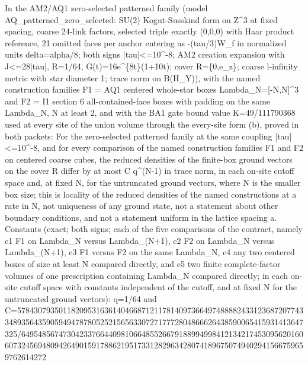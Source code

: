 \begin{gatequote}
In the AM2/AQ1 zero-selected patterned family (model
AQ\_patterned\_zero\_selected: SU(2) Kogut-Susskind form on
Z\textasciicircum{}3 at fixed spacing, coarse 24-link factors, selected triple
exactly (0,0,0) with Haar product reference, 21 omitted faces per anchor
entering as -(tau/3)W\_f in normalized units delta=alpha/8; both signs
|tau|<=10\textasciicircum{}-8; AM2 creation expansion with J<=28|tau|, R=1/64,
G(t)=16e\textasciicircum{}\{8t\}(1+10t); cover R=\{0,e\_z\}; coarse l-infinity
metric with star diameter 1; trace norm on B(H\_Y)), with the named
construction families F1 = AQ1 centered whole-star boxes
Lambda\_N=[-N,N]\textasciicircum{}3 and F2 = I1 section 6 all-contained-face
boxes with padding on the same Lambda\_N, N at least 2, and with the BA1 gate
bound value K=49/111790368 used at every site of the union volume through the
every-site form (b), proved in both packets: For the zero-selected patterned
family at the same coupling |tau|<=10\textasciicircum{}-8, and for every
comparison of the named construction families F1 and F2 on centered coarse
cubes, the reduced densities of the finite-box ground vectors on the cover R
differ by at most C q\textasciicircum{}(N-1) in trace norm, in each on-site
cutoff space and, at fixed N, for the untruncated ground vectors, where N is
the smaller box size; this is locality of the reduced densities of the named
constructions at a rate in N, not uniqueness of any ground state, not a
statement about other boundary conditions, and not a statement uniform in the
lattice spacing a. Constants (exact; both signs; each of the five comparisons
of the contract, namely c1 F1 on Lambda\_N versus Lambda\_(N+1), c2 F2 on
Lambda\_N versus Lambda\_(N+1), c3 F1 versus F2 on the same Lambda\_N, c4 any
two centered boxes of size at least N compared directly, and c5 two finite
complete-factor volumes of one prescription containing Lambda\_N compared
directly; in each on-site cutoff space with constants independent of the
cutoff, and at fixed N for the untruncated ground vectors): q=1/64 and
C=5784\allowbreak{}307935\allowbreak{}011820\allowbreak{}953163\allowbreak{}614046\allowbreak{}687121\allowbreak{}178140\allowbreak{}973664\allowbreak{}974888\allowbreak{}824331\allowbreak{}236872\allowbreak{}077433\allowbreak{}489356\allowbreak{}435905\allowbreak{}949478\allowbreak{}780525\allowbreak{}215656\allowbreak{}330727\allowbreak{}177728\allowbreak{}048666\allowbreak{}264385\allowbreak{}900654\allowbreak{}159314\allowbreak{}136473\allowbreak{}25/649\allowbreak{}548567\allowbreak{}473042\allowbreak{}337664\allowbreak{}409810\allowbreak{}664855\allowbreak{}266791\allowbreak{}889949\allowbreak{}984121\allowbreak{}342174\allowbreak{}530956\allowbreak{}201606\allowbreak{}073245\allowbreak{}694809\allowbreak{}426490\allowbreak{}159178\allowbreak{}862195\allowbreak{}173312\allowbreak{}829634\allowbreak{}280741\allowbreak{}896750\allowbreak{}749402\allowbreak{}941566\allowbreak{}759659\allowbreak{}762614\allowbreak{}272

\end{gatequote}
